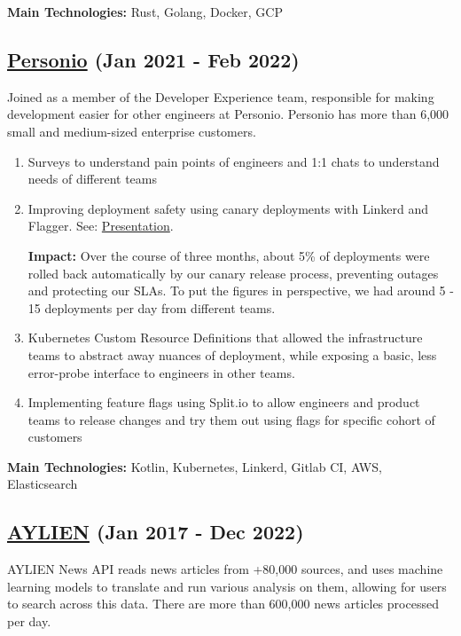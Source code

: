 \documentclass[10pt,a4paper]{article}
\begin{document}
\textbf{Main Technologies: } Rust, Golang, Docker, GCP

\subsection{\href{https://personio.com}{Personio} (Jan 2021 - Feb 2022)}

Joined as a member of the Developer Experience team, responsible for making development easier for other engineers at Personio. Personio has more than 6,000 small and medium-sized enterprise customers.

\begin{enumerate}
\item{Surveys to understand pain points of engineers and 1:1 chats to understand needs of different teams}
\item{Improving deployment safety using canary deployments with Linkerd and Flagger. See: \href{https://docs.google.com/presentation/d/1uEh60yJAxWtwQ0Us9AVRBEWXnxNzy1lKxv9mL9-gOuk/edit#slide=id.g7e24e7634d_0_99}{Presentation}.

\textbf{Impact:} Over the course of three months, about 5\% of deployments were rolled back automatically by our canary release process, preventing outages and protecting our SLAs. To put the figures in perspective, we had around 5 - 15 deployments per day from different teams.}

\item{Kubernetes Custom Resource Definitions that allowed the infrastructure teams to abstract away nuances of deployment, while exposing a basic, less error-probe interface to engineers in other teams.}

\item{Implementing feature flags using Split.io to allow engineers and product teams to release changes and try them out using flags for specific cohort of customers}

\end{enumerate}

\textbf{Main Technologies: } Kotlin, Kubernetes, Linkerd, Gitlab CI, AWS, Elasticsearch

\subsection{\href{https://aylien.com}{AYLIEN} (Jan 2017 - Dec 2022)}

AYLIEN News API reads news articles from +80,000 sources, and uses machine learning models to translate and run various analysis on them, allowing for users to search across this data. There are more than 600,000 news articles processed per day.
\end{document}
